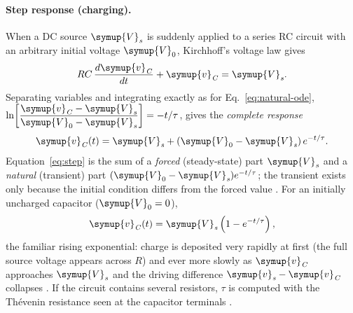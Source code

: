 \documentclass[12pt,a4paper]{article}
\begin{document}
	\paragraph{Step response (charging).}
	When a DC source $\symup{V}_{\mathit{s}}$ is suddenly applied to a series RC circuit
	with an arbitrary initial voltage $\symup{V}_{0}$, Kirchhoff's voltage law gives
	\begin{equation}
		RC\,\frac{d\symup{v}_{\mathit{C}}}{dt} + \symup{v}_{\mathit{C}} = \symup{V}_{\mathit{s}} .
		\label{eq:step-ode}
	\end{equation}
	Separating variables and integrating exactly as for
	Eq.~\eqref{eq:natural-ode},
	$\ln\!\left[\dfrac{\symup{v}_{\mathit{C}} - \symup{V}_{\mathit{s}}}{\symup{V}_{0} - \symup{V}_{\mathit{s}}}\right] = -t/\tau$, gives the
	\emph{complete response}
	\begin{equation}
		\symup{v}_{\mathit{C}}(t) = \symup{V}_{\mathit{s}} + (\symup{V}_{0} - \symup{V}_{\mathit{s}})\, e^{-t/\tau}.
		\label{eq:step}
	\end{equation}
	Equation~\eqref{eq:step} is the sum of a \emph{forced}
	(steady-state) part $\symup{V}_{\mathit{s}}$ and a \emph{natural} (transient) part
	$(\symup{V}_{0} - \symup{V}_{\mathit{s}})e^{-t/\tau}$; the transient exists only because the
	initial condition differs from the forced value \cite{sadiku}.  For an
	initially uncharged capacitor ($\symup{V}_{0} = 0$),
	\begin{equation}
		\symup{v}_{\mathit{C}}(t) = \symup{V}_{\mathit{s}}\left(1 - e^{-t/\tau}\right),
		\label{eq:charging}
	\end{equation}
	the familiar rising exponential: charge is deposited very rapidly at
	first (the full source voltage appears across $R$) and ever more
	slowly as $\symup{v}_{\mathit{C}}$ approaches $\symup{V}_{\mathit{s}}$ and the driving difference
	$\symup{v}_{\mathit{s}} - \symup{v}_{\mathit{C}}$ collapses \cite{boylestad}.  If the circuit contains
	several resistors, $\tau$ is computed with the Th\'evenin resistance
	seen at the capacitor terminals \cite{sadiku}.
	
\end{document}
